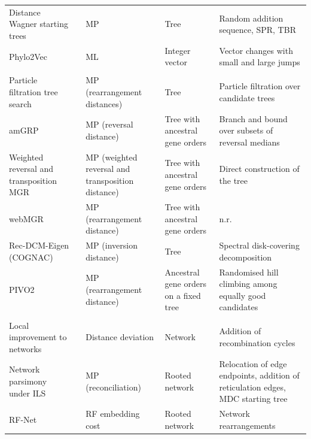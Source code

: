 \begin{landscape}
{\begin{longtable}{>{\raggedright\arraybackslash}p{3.4cm}>{\raggedright\arraybackslash}p{4.0cm}>{\raggedright\arraybackslash}p{3.6cm}>{\raggedright\arraybackslash}p{2.2cm}>{\raggedright\arraybackslash}p{4.5cm}}
Distance Wagner starting trees & \cite{R04414} & MP & Tree & Random addition sequence, SPR, TBR\\
Phylo2Vec & \cite{R03547} & ML & Integer vector & Vector changes with small and large jumps\\
\addlinespace
\multicolumn{5}{l}{\textit{Gene order inference}}\\
Particle filtration tree search & \cite{R07653} & MP (rearrangement distances) & Tree & Particle filtration over candidate trees\\
amGRP & \cite{R08041} & MP (reversal distance) & Tree with ancestral gene orders & Branch and bound over subsets of reversal medians\\
Weighted reversal and transposition MGR & \cite{R08266} & MP (weighted reversal and transposition distance) & Tree with ancestral gene orders & Direct construction of the tree\\
webMGR & \cite{R08679} & MP (rearrangement distance) & Tree with ancestral gene orders & n.r.\\
Rec-DCM-Eigen (COGNAC) & \cite{R08790} & MP (inversion distance) & Tree & Spectral disk-covering decomposition\\
PIVO2 & \cite{R08581} & MP (rearrangement distance) & Ancestral gene orders on a fixed tree & Randomised hill climbing among equally good candidates\\
\addlinespace
\multicolumn{5}{l}{\textit{Network inference}}\\
Local improvement to networks & \cite{R04006} & Distance deviation & Network & Addition of recombination cycles\\
Network parsimony under ILS & \cite{R03661} & MP (reconciliation) & Rooted network & Relocation of edge endpoints, addition of reticulation edges, MDC starting tree\\
RF-Net & \cite{R05285} & RF embedding cost & Rooted network & Network rearrangements\\
\end{longtable}
}
\end{landscape}
